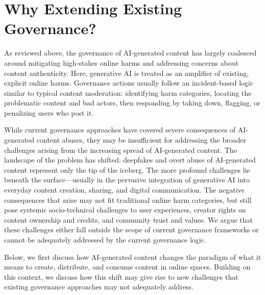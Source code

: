 \section{Why Extending Existing Governance?}
\label{sec:discuss}
As reviewed above, the governance of AI-generated content has largely coalesced around mitigating high-stakes online harms and addressing concerns about content authenticity. Here, generative AI is treated as an amplifier of existing, explicit online harms. Governance actions usually follow an incident-based logic similar to typical content moderation: identifying harm categories, locating the problematic content and bad actors, then responding by taking down, flagging, or penalizing users who post it.

While current governance approaches have covered severe consequences of AI-generated content abuses, they may be insufficient for addressing the broader challenges arising from the increasing spread of AI-generated content.
The landscape of the problem has shifted: deepfakes and overt abuse of AI-generated content represent only the tip of the iceberg. The more profound challenges lie beneath the surface---usually in the pervasive integration of generative AI into everyday content creation, sharing, and digital communication. The negative consequences that arise may not fit traditional online harm categories, but still pose systemic socio-technical challenges to user experiences, creator rights on content ownership and credits, and community trust and values. We argue that these challenges either fall outside the scope of current governance frameworks or cannot be adequately addressed by the current governance logic.

Below, we first discuss how AI-generated content changes the paradigm of what it means to create, distribute, and consume content in online spaces. Building on this context, we discuss how this shift may give rise to new challenges that existing governance approaches may not adequately address.%

